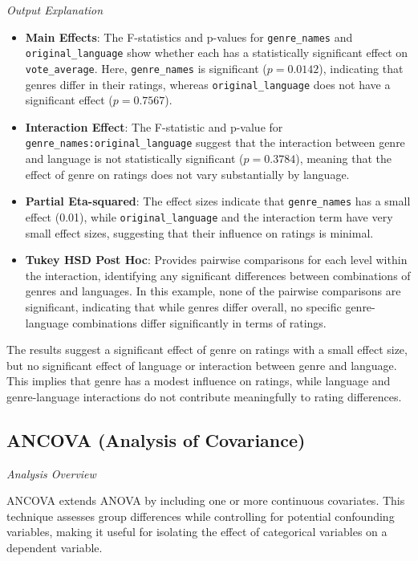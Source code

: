 \documentclass[
]{book}
\providecommand{\tightlist}{%
  \setlength{\itemsep}{0pt}\setlength{\parskip}{0pt}}
\begin{document}
\emph{Output Explanation}

\begin{itemize}
\tightlist
\item
  \textbf{Main Effects}: The F-statistics and p-values for \texttt{genre\_names} and \texttt{original\_language} show whether each has a statistically significant effect on \texttt{vote\_average}. Here, \texttt{genre\_names} is significant (\(p = 0.0142\)), indicating that genres differ in their ratings, whereas \texttt{original\_language} does not have a significant effect (\(p = 0.7567\)).
\item
  \textbf{Interaction Effect}: The F-statistic and p-value for \texttt{genre\_names:original\_language} suggest that the interaction between genre and language is not statistically significant (\(p = 0.3784\)), meaning that the effect of genre on ratings does not vary substantially by language.
\item
  \textbf{Partial Eta-squared}: The effect sizes indicate that \texttt{genre\_names} has a small effect (0.01), while \texttt{original\_language} and the interaction term have very small effect sizes, suggesting that their influence on ratings is minimal.
\item
  \textbf{Tukey HSD Post Hoc}: Provides pairwise comparisons for each level within the interaction, identifying any significant differences between combinations of genres and languages. In this example, none of the pairwise comparisons are significant, indicating that while genres differ overall, no specific genre-language combinations differ significantly in terms of ratings.
\end{itemize}

The results suggest a significant effect of genre on ratings with a small effect size, but no significant effect of language or interaction between genre and language. This implies that genre has a modest influence on ratings, while language and genre-language interactions do not contribute meaningfully to rating differences.

\subsection*{ANCOVA (Analysis of Covariance)}\label{ancova-analysis-of-covariance}

\emph{Analysis Overview}

ANCOVA extends ANOVA by including one or more continuous covariates. This technique assesses group differences while controlling for potential confounding variables, making it useful for isolating the effect of categorical variables on a dependent variable.
\end{document}
